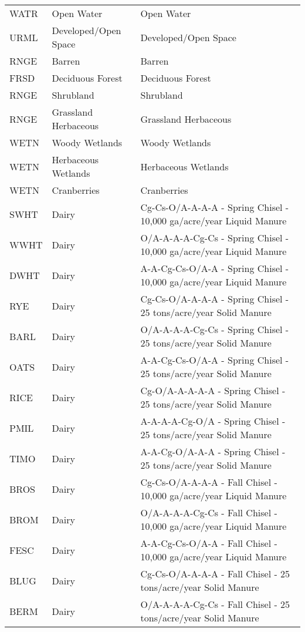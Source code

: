 \begin{landscape}
\begin{longtable}{lll}
	\hline
	\endlastfoot
WATR & Open Water & Open Water  \\ 
  URML & Developed/Open Space & Developed/Open Space  \\ 
  RNGE & Barren & Barren  \\ 
  FRSD & Deciduous Forest & Deciduous Forest  \\ 
  RNGE & Shrubland & Shrubland  \\ 
  RNGE & Grassland Herbaceous & Grassland Herbaceous  \\ 
  WETN & Woody Wetlands & Woody Wetlands  \\ 
  WETN & Herbaceous Wetlands & Herbaceous Wetlands  \\ 
  WETN & Cranberries & Cranberries  \\ 
  SWHT & Dairy & Cg-Cs-O/A-A-A-A - Spring Chisel - 10,000 ga/acre/year Liquid Manure  \\ 
  WWHT & Dairy & O/A-A-A-A-Cg-Cs - Spring Chisel - 10,000 ga/acre/year Liquid Manure  \\ 
  DWHT & Dairy & A-A-Cg-Cs-O/A-A - Spring Chisel - 10,000 ga/acre/year Liquid Manure  \\ 
  RYE & Dairy & Cg-Cs-O/A-A-A-A - Spring Chisel - 25 tons/acre/year Solid Manure  \\ 
  BARL & Dairy & O/A-A-A-A-Cg-Cs - Spring Chisel - 25 tons/acre/year Solid Manure  \\ 
  OATS & Dairy & A-A-Cg-Cs-O/A-A - Spring Chisel - 25 tons/acre/year Solid Manure  \\ 
  RICE & Dairy & Cg-O/A-A-A-A-A - Spring Chisel - 25 tons/acre/year Solid Manure  \\ 
  PMIL & Dairy & A-A-A-A-Cg-O/A - Spring Chisel - 25 tons/acre/year Solid Manure  \\ 
  TIMO & Dairy & A-A-Cg-O/A-A-A - Spring Chisel - 25 tons/acre/year Solid Manure  \\ 
  BROS & Dairy & Cg-Cs-O/A-A-A-A - Fall Chisel - 10,000 ga/acre/year Liquid Manure  \\ 
  BROM & Dairy & O/A-A-A-A-Cg-Cs - Fall Chisel - 10,000 ga/acre/year Liquid Manure  \\ 
  FESC & Dairy & A-A-Cg-Cs-O/A-A - Fall Chisel - 10,000 ga/acre/year Liquid Manure  \\ 
  BLUG & Dairy & Cg-Cs-O/A-A-A-A - Fall Chisel - 25 tons/acre/year Solid Manure  \\ 
  BERM & Dairy & O/A-A-A-A-Cg-Cs - Fall Chisel - 25 tons/acre/year Solid Manure  \\ 

\end{longtable}
\end{landscape}
